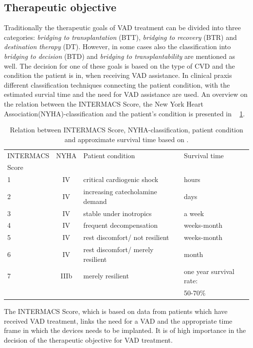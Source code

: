 \subsection{Therapeutic objective}
Traditionally the therapeutic goals of VAD treatment can be divided into three categories: \textit{bridging to transplantation} (BTT), \textit{bridging to recovery} (BTR) and \textit{destination therapy} (DT). However, in some cases also the classification into \textit{bridging to decision} (BTD) and \textit{bridging to transplantability} are mentioned as well. The decision for one of these goals is based on the type of CVD and the condition the patient is in, when receiving VAD assistance. \cite{VAD6} In clinical praxis different classification techniques connecting the patient condition, with the estimated survial time and the need for VAD assistance are used. An overview on the relation between the INTERMACS Score, the New York Heart Association(NYHA)-classification and the patient's condition is presented in \tablename~ \ref{tab:Table1}.
\begin{table}[ht]
  \begin{tabularx}{\textwidth}{l|c|l|l}
    \toprule
    INTERMACS & NYHA & Patient condition & Survival time  \\
    Score & & &\\
    \midrule
    1 & IV & critical cardiogenic shock & hours \\
    2 & IV & increasing catecholamine demand & days \\
    3 & IV & stable under inotropics & a week \\
    4 & IV & frequent decompensation & weeks-month \\
    5 & IV & rest discomfort/ not resilient & weeks-month \\
    6 & IV & rest discomfort/ merely resilient & month \\
    7 & IIIb & merely resilient & one year survival rate: \\
     & & & 50-70\% \\
     \bottomrule
  \end{tabularx}
  \caption[Relation between INTERMACS Score and NYHA-classification]{Relation between INTERMACS Score, NYHA-classification, patient condition and approximate survival time based on \cite{VAD5}.}
  \label{tab:Table1}
\end{table}
The INTERMACS Score, which is based on data from patients which have received VAD treatment, links the need for a VAD and the appropriate time frame in which the devices needs to be implanted. It is of high importance in the decision of the therapeutic objective for VAD treatment. \cite{VAD7}
